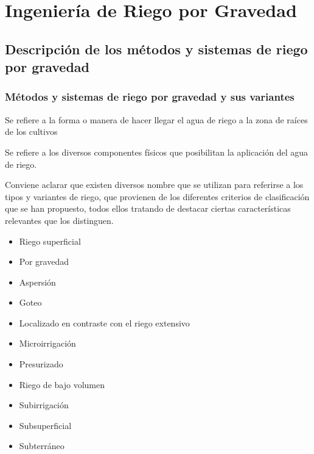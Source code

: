 \chapter{Ingeniería de Riego por Gravedad}
\section{Descripción de los métodos y sistemas de riego por gravedad}
\subsection{Métodos y sistemas de riego por gravedad y sus variantes}
\begin{definition}
    Se refiere a la forma o manera de hacer llegar el agua de riego a la zona de raíces de los cultivos
\end{definition}
\begin{definition}
    Se refiere a los diversos componentes físicos que posibilitan la aplicación del agua de riego.
\end{definition}
Conviene aclarar que existen diversos nombre que se utilizan para referirse a los tipos y variantes de riego, que provienen de los diferentes criterios de clasificación que se han propuesto, todos ellos tratando de destacar ciertas características relevantes que los distinguen.
\begin{itemize}
    \item Riego superficial
    \item Por gravedad
    \item Aspersión
    \item Goteo
    \item Localizado en contraste con el riego extensivo
    \item Microirrigación
    \item Presurizado
    \item Riego de bajo volumen
    \item Subirrigación
    \item Subsuperficial
    \item Subterráneo
\end{itemize}
